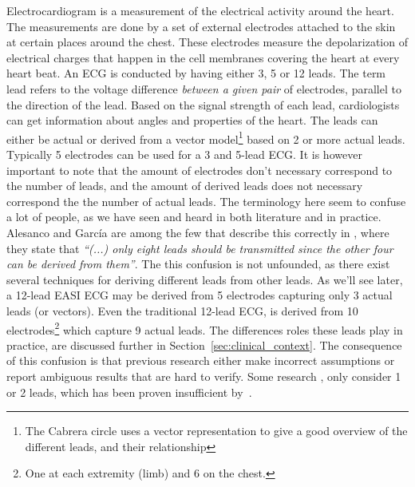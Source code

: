Electrocardiogram is a measurement of the electrical activity around the heart. The measurements are done by a set of external electrodes attached to the skin at certain places around the chest. These electrodes measure the depolarization of electrical charges that happen in the cell membranes covering the heart at every heart beat. An ECG is conducted by having either 3, 5 or 12 leads. The term lead refers to the voltage difference \textit{between a given pair} of electrodes, parallel to the direction of the lead. Based on the signal strength of each lead, cardiologists can get information about angles and properties of the heart. The leads can either be actual or derived from a vector model\footnote{ The Cabrera circle uses a vector representation to give a good overview of the different leads, and their relationship} based on 2 or more actual leads. Typically 5 electrodes can be used for a 3 and 5-lead ECG. It is however important to note that the amount of electrodes don't necessary correspond to the number of leads, and the amount of derived leads does not necessary correspond the the number of actual leads. The terminology here seem to confuse a lot of people, as we have seen and heard in both literature and in practice. Alesanco and García are among the few that describe this correctly in \cite{Alesanco:2010kc}, where they state that \textit{``(...) only eight leads should be transmitted since the other four can be derived from them''}. The this confusion is not unfounded, as there exist several techniques for deriving different leads from other leads. As we'll see later, a 12-lead EASI ECG may be derived from 5 electrodes capturing only 3 actual leads (or vectors). Even the traditional 12-lead ECG, is derived from 10 electrodes\footnote{ One at each extremity (limb) and 6 on the chest.} which capture 9 actual leads. The differences roles these leads play in practice, are discussed further in Section~\ref{sec:clinical_context}. The consequence of this confusion is that previous research either make incorrect assumptions or report ambiguous results that are hard to verify. Some research \cite{yubin:2012tr, Lee:2009bu, Alesanco:2010kc}, only consider 1 or 2 leads, which has been proven insufficient by~\cite{Drew:1998wp}.

